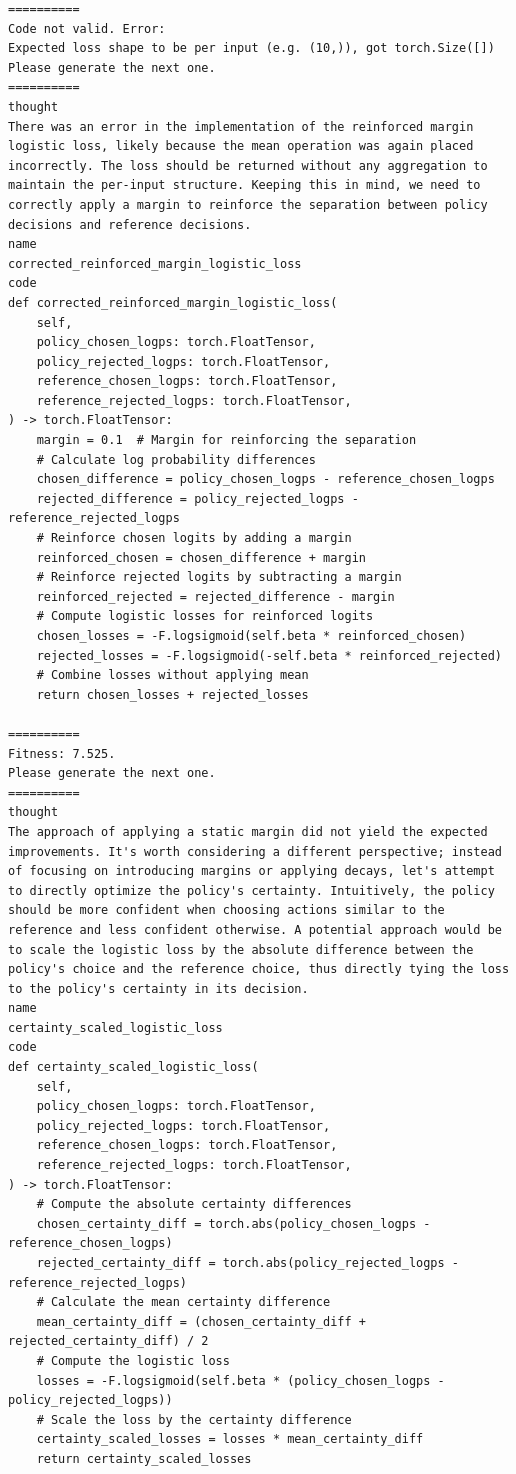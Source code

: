 \documentclass{article}
\theoremstyle{plain}
\theoremstyle{definition}
\theoremstyle{remark}
\begin{document}
\begin{lstlisting}
==========
Code not valid. Error:
Expected loss shape to be per input (e.g. (10,)), got torch.Size([])
Please generate the next one.
==========
thought
There was an error in the implementation of the reinforced margin logistic loss, likely because the mean operation was again placed incorrectly. The loss should be returned without any aggregation to maintain the per-input structure. Keeping this in mind, we need to correctly apply a margin to reinforce the separation between policy decisions and reference decisions.
name
corrected_reinforced_margin_logistic_loss
code
def corrected_reinforced_margin_logistic_loss(
    self,
    policy_chosen_logps: torch.FloatTensor,
    policy_rejected_logps: torch.FloatTensor,
    reference_chosen_logps: torch.FloatTensor,
    reference_rejected_logps: torch.FloatTensor,
) -> torch.FloatTensor:
    margin = 0.1  # Margin for reinforcing the separation
    # Calculate log probability differences
    chosen_difference = policy_chosen_logps - reference_chosen_logps
    rejected_difference = policy_rejected_logps - reference_rejected_logps
    # Reinforce chosen logits by adding a margin
    reinforced_chosen = chosen_difference + margin
    # Reinforce rejected logits by subtracting a margin
    reinforced_rejected = rejected_difference - margin
    # Compute logistic losses for reinforced logits
    chosen_losses = -F.logsigmoid(self.beta * reinforced_chosen)
    rejected_losses = -F.logsigmoid(-self.beta * reinforced_rejected)
    # Combine losses without applying mean
    return chosen_losses + rejected_losses
    
==========
Fitness: 7.525.
Please generate the next one.
==========
thought
The approach of applying a static margin did not yield the expected improvements. It's worth considering a different perspective; instead of focusing on introducing margins or applying decays, let's attempt to directly optimize the policy's certainty. Intuitively, the policy should be more confident when choosing actions similar to the reference and less confident otherwise. A potential approach would be to scale the logistic loss by the absolute difference between the policy's choice and the reference choice, thus directly tying the loss to the policy's certainty in its decision.
name
certainty_scaled_logistic_loss
code
def certainty_scaled_logistic_loss(
    self,
    policy_chosen_logps: torch.FloatTensor,
    policy_rejected_logps: torch.FloatTensor,
    reference_chosen_logps: torch.FloatTensor,
    reference_rejected_logps: torch.FloatTensor,
) -> torch.FloatTensor:
    # Compute the absolute certainty differences
    chosen_certainty_diff = torch.abs(policy_chosen_logps - reference_chosen_logps)
    rejected_certainty_diff = torch.abs(policy_rejected_logps - reference_rejected_logps)
    # Calculate the mean certainty difference
    mean_certainty_diff = (chosen_certainty_diff + rejected_certainty_diff) / 2
    # Compute the logistic loss
    losses = -F.logsigmoid(self.beta * (policy_chosen_logps - policy_rejected_logps))
    # Scale the loss by the certainty difference
    certainty_scaled_losses = losses * mean_certainty_diff
    return certainty_scaled_losses
    

\end{lstlisting}
\end{document}
